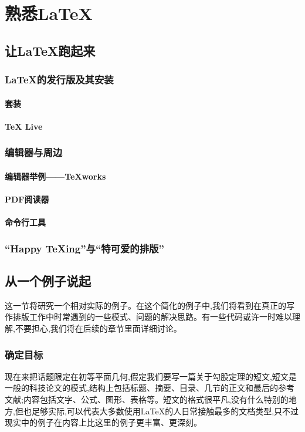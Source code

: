 \chapter{熟悉\LaTeX }
\section{让\LaTeX 跑起来}
\subsection{\LaTeX 的发行版及其安装}
\subsubsection{\CTeX 套装}
\subsubsection{{\TeX} Live}
\subsection{编辑器与周边}
\subsubsection{编辑器举例——TeXworks}
\subsubsection{PDF阅读器}
\subsubsection{命令行工具}
\subsection{“Happy TeXing”与“特可爱的排版”}
\section{从一个例子说起}
 这一节将研究一个相对实际的例子。在这个简化的例子中,我们将看到在真正的写作排版工作中时常遇到的一些模式、问题的解决思路。有一些代码或许一时难以理解,不要担心,我们将在后续的章节里面详细讨论。
\subsection{确定目标}
现在来把话题限定在初等平面几何,假定我们要写一篇关于勾股定理的短文,短文是一般的科技论文的模式,结构上包括标题、摘要、目录、几节的正文和最后的参考文献;内容包括文字、公式、图形、表格等。短文的格式很平凡,没有什么特别的地方,但也足够实际,可以代表大多数使用\LaTeX 的人日常接触最多的文档类型,只不过现实中的例子在内容上比这里的例子更丰富、更深刻。

